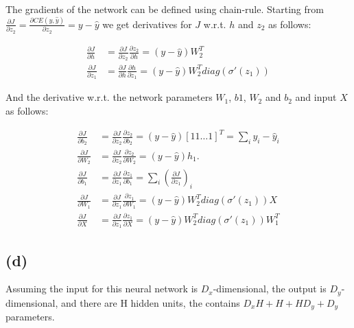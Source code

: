 \documentclass[11pt]{article}
\begin{document}
The gradients of the network can be defined using chain-rule. Starting from $\frac{\partial J}{\partial z_{2}} = \frac{\partial CE(y, \hat{y})}{\partial z_{2}} = y - \hat{y}$ we get derivatives for $J$ w.r.t. $h$ and $z_{2}$ as follows:

\begin{equation*}
  \label{eq:temp-grads}
  \begin{split}
    \frac{\partial J}{\partial h} &= \frac{\partial J}{\partial z_{2}}\frac{\partial z_{2}}{\partial h} = (y - \hat{y}) W_{2}^{T}
    \\
    \frac{\partial J}{\partial z_{1}} &= \frac{\partial J}{\partial h}\frac{\partial h}{\partial z_{1}} = (y - \hat{y}) W_{2}^{T} diag(\sigma'(z_{1}))
  \end{split}
\end{equation*}

And the derivative w.r.t. the network parameters $W_{1}$, $b{1}$, $W_{2}$ and $b_{2}$ and input $X$ as follows:

\begin{equation*}
  \label{eq:param-grads}
  \begin{split}
    \frac{\partial J}{\partial b_{2}} &= \frac{\partial J}{\partial z_{2}}\frac{\partial z_{2}}{\partial b_{2}} = (y - \hat{y}) [1 1 \hdots 1]^{T} = \sum_{i}{y_{i} - \hat{y}_{i}}
    \\
    \frac{\partial J}{\partial W_{2}} &= \frac{\partial J}{\partial z_{2}}\frac{\partial z_{2}}{\partial W_{2}} = (y - \hat{y}) h_{1}.
    \\
    \frac{\partial J}{\partial b_{1}} &= \frac{\partial J}{\partial z_{1}}\frac{\partial z_{1}}{\partial b_{1}} = \sum_{i}{(\frac{\partial J}{\partial z_{1}})_{i}}
    \\
    \frac{\partial J}{\partial W_{1}} &= \frac{\partial J}{\partial z_{1}}\frac{\partial z_{1}}{\partial W_{1}} = (y - \hat{y}) W_{2}^{T} diag(\sigma'(z_{1})) X
    \\
    \frac{\partial J}{\partial X} &= \frac{\partial J}{\partial z_{1}}\frac{\partial z_{1}}{\partial X} = (y - \hat{y}) W_{2}^{T} diag(\sigma'(z_{1})) W_{1}^{T}
  \end{split}
\end{equation*}

\subsection*{(d)}
Assuming the input for this neural network is $D_{x}$-dimensional, the output is $D_{y}$-dimensional, and there are H hidden units, the contains $D_{x}H + H + HD_{y} + D_{y}$ parameters.
\end{document}
